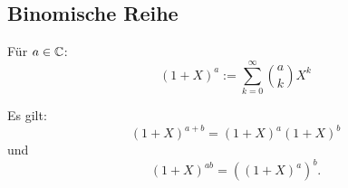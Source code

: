 \subsection{Binomische Reihe}
\begin{Definition}
Für $a\in\mathbb C$:
\begin{equation}
(1+X)^a := \sum_{k=0}^\infty \binom{a}{k} X^k
\end{equation}
\end{Definition}
\noindent
Es gilt:
\begin{equation}
(1+X)^{a+b} = (1+X)^a (1+X)^b 
\end{equation}
und
\begin{equation}
(1+X)^{ab} = ((1+X)^a)^b.
\end{equation}
